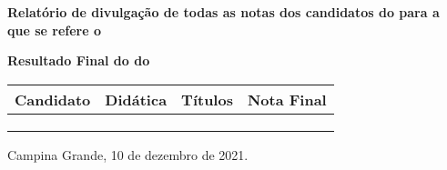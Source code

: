 \documentclass[12pt]{uaefata}
\date{}
\begin{document}
	
\begin{letter}{
		\textbf{Relatório de divulgação de todas as notas dos candidatos  do \concurso para \cargo  a que se refere o \edital}
	}
	
\opening{}

\centering

\textbf{Resultado Final do \concurso do \edital}

\begin{tabular}{|l|c|c|c|}
	\hline
	\textbf{Candidato}	&	\textbf{Didática}	&	\textbf{Títulos}	&	\textbf{Nota Final}	\\
	\hline
	\cdta	&	\cdtand 	&	\cdtant	&	\cdtanf  	\\
	\cdtb	&	\cdtbnd 	&	\cdtbnt	&	\cdtbnf 	\\
	\cdtc	&	\cdtcnd 	&	\cdtcnt	& 	\cdtcnf 	\\
	\hline
\end{tabular}

		
		\closing{Campina Grande, 10 de dezembro de 2021.}
		
		
		
		
	\end{letter}
	
\end{document}
